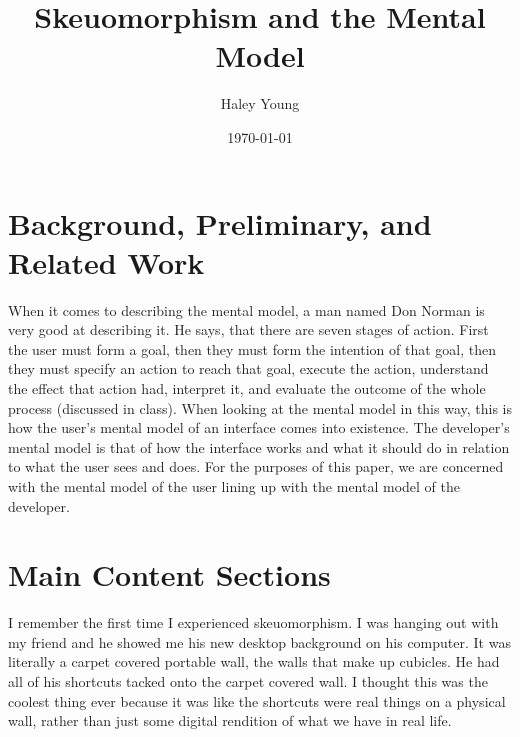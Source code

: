 \documentclass{article}
\title{Skeuomorphism and the Mental Model}
\author{Haley Young}
\date{\today}
\begin{document}
\maketitle


\pagebreak
\tableofcontents
\pagebreak

\section{Background, Preliminary, and Related Work}
	When it comes to describing the mental model, a man named Don Norman is very good at describing it. He says, that there are seven stages of action. First the user must form a goal, then they must form the intention of that goal, then they must specify an action to reach that goal, execute the action, understand the effect that action had, interpret it, and evaluate the outcome of the whole process (discussed in class). When looking at the mental model in this way, this is how the user's mental model of an interface comes into existence. The developer's mental model is that of how the interface works and what it should do in relation to what the user sees and does. For the purposes of this paper, we are concerned with the mental model of the user lining up with the mental model of the developer.

\section{Main Content Sections}

I remember the first time I experienced skeuomorphism. I was hanging out with my friend and he showed me his new desktop background on his computer. It was literally a carpet covered portable wall, the walls that make up cubicles. He had all of his shortcuts tacked onto the carpet covered wall. I thought this was the coolest thing ever because it was like the shortcuts were real things on a physical wall, rather than just some digital rendition of what we have in real life.
\end{document}
